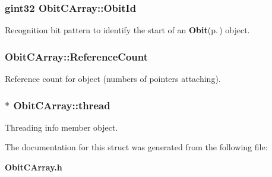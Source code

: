 \subsubsection{\setlength{\rightskip}{0pt plus 5cm}gint32 {\bf Obit\-CArray::Obit\-Id}}\label{structObitCArray_o0}


Recognition bit pattern to identify the start of an {\bf Obit}{\rm (p.\,\pageref{structObit})} object. 

\subsubsection{ {\bf Obit\-CArray::Reference\-Count}}\label{structObitCArray_o2}


Reference count for object (numbers of pointers attaching). 

\subsubsection{$\ast$ {\bf Obit\-CArray::thread}}\label{structObitCArray_o4}


Threading info member object. 



The documentation for this struct was generated from the following file:\begin{CompactItemize}
\item 
{\bf Obit\-CArray.h}\end{CompactItemize}
